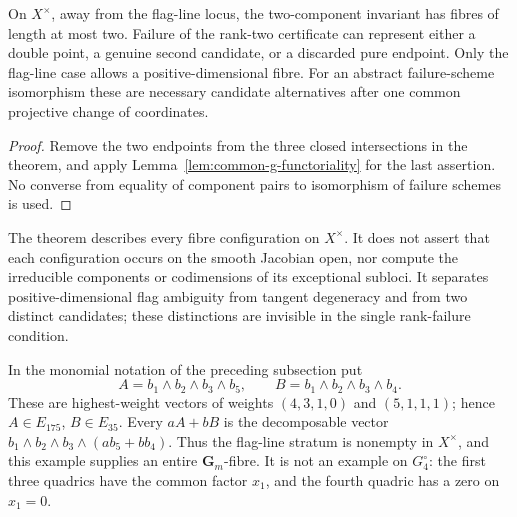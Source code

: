 \begin{corollary}
\label{cor:exceptional-candidate-bound}
On \(X^\times\), away from the flag-line locus, the two-component
invariant has fibres of length at most two.  Failure of the rank-two
certificate can represent either a double point, a genuine second
candidate, or a discarded pure endpoint.  Only the flag-line case
allows a positive-dimensional fibre.  For an abstract failure-scheme
isomorphism these are necessary candidate alternatives after one
common projective change of coordinates.
\end{corollary}
\begin{proof}
Remove the two endpoints from the three closed intersections in the
theorem, and apply Lemma~\ref{lem:common-g-functoriality} for the
last assertion.  No converse from equality of component pairs to
isomorphism of failure schemes is used.
\end{proof}

The theorem describes every fibre configuration on \(X^\times\).
It does not assert that each configuration occurs on the smooth
Jacobian open, nor compute the irreducible components or codimensions
of its exceptional subloci.  It separates positive-dimensional flag
ambiguity from tangent degeneracy and from two distinct candidates;
these distinctions are invisible in the single rank-failure condition.

\begin{example}
\label{ex:exceptional-flag-line}
In the monomial notation of the preceding subsection put
\[
 A=b_1\wedge b_2\wedge b_3\wedge b_5,\qquad
 B=b_1\wedge b_2\wedge b_3\wedge b_4.
\]
These are highest-weight vectors of weights \((4,3,1,0)\) and
\((5,1,1,1)\); hence \(A\in E_{175}\), \(B\in E_{35}\).
Every \(aA+bB\) is the decomposable vector
\(b_1\wedge b_2\wedge b_3\wedge(ab_5+bb_4)\).
Thus the flag-line stratum is nonempty in \(X^\times\), and this
example supplies an entire \(\mathbf G_m\)-fibre.  It is not an
example on \(G_4^\circ\): the first three quadrics have the common
factor \(x_1\), and the fourth quadric has a zero on \(x_1=0\).
\end{example}
